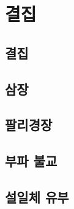 \documentclass[12pt, a4paper, oneside]{book}
\let\stdsection\section
\renewcommand\section{\newpage\stdsection}
\begin{document}
	\chapter{ 결집 }
	\noptcrule

	\newpage	
	\minitoc



%
	\section{ 결집 }


%
	\section{ 삼장 }


%										
	\section{ 	팔리경장	}							
										
%										
	\section{ 	부파 불교	}							
										
%										
	\section{ 	설일체 유부	}							
\end{document}
